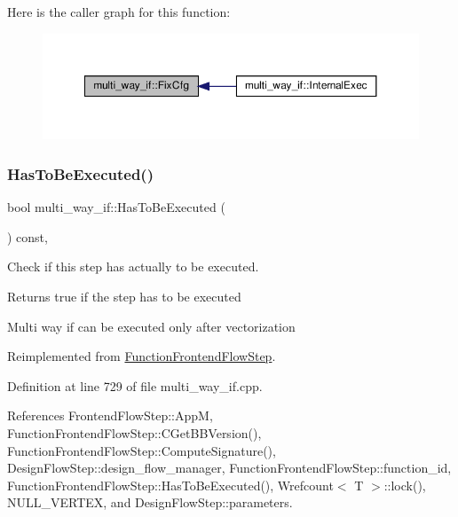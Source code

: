 Here is the caller graph for this function\+:
\nopagebreak
\begin{figure}[H]
\begin{center}
\leavevmode
\includegraphics[width=350pt]{dd/dca/classmulti__way__if_a5d3d9ceeead0ef86f24f33e3bd165c84_icgraph}
\end{center}
\end{figure}
\mbox{\label{classmulti__way__if_a067bd457b6d38a33de81d0a3b474f947}} 
\subsubsection{\texorpdfstring{Has\+To\+Be\+Executed()}{HasToBeExecuted()}}
{\footnotesize\ttfamily bool multi\+\_\+way\+\_\+if\+::\+Has\+To\+Be\+Executed (\begin{DoxyParamCaption}{ }\end{DoxyParamCaption}) const\hspace{0.3cm}{\ttfamily [override]}, {\ttfamily [virtual]}}



Check if this step has actually to be executed. 

\begin{DoxyReturn}{Returns}
true if the step has to be executed 
\end{DoxyReturn}
Multi way if can be executed only after vectorization 

Reimplemented from \hyperlink{classFunctionFrontendFlowStep_a12e786363530aa9533e4bd9380130d75}{Function\+Frontend\+Flow\+Step}.



Definition at line 729 of file multi\+\_\+way\+\_\+if.\+cpp.



References Frontend\+Flow\+Step\+::\+AppM, Function\+Frontend\+Flow\+Step\+::\+C\+Get\+B\+B\+Version(), Function\+Frontend\+Flow\+Step\+::\+Compute\+Signature(), Design\+Flow\+Step\+::design\+\_\+flow\+\_\+manager, Function\+Frontend\+Flow\+Step\+::function\+\_\+id, Function\+Frontend\+Flow\+Step\+::\+Has\+To\+Be\+Executed(), Wrefcount$<$ T $>$\+::lock(), N\+U\+L\+L\+\_\+\+V\+E\+R\+T\+EX, and Design\+Flow\+Step\+::parameters.

